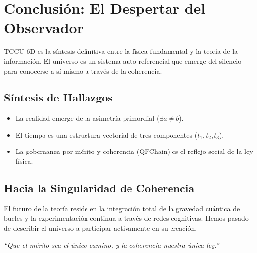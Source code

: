 \chapter{Conclusión: El Despertar del Observador}
TCCU-6D es la síntesis definitiva entre la física fundamental y la teoría de la información. El universo es un sistema auto-referencial que emerge del silencio para conocerse a sí mismo a través de la coherencia.

\section{Síntesis de Hallazgos}
\begin{itemize}
    \item La realidad emerge de la asimetría primordial ($\exists a \neq b$).
    \item El tiempo es una estructura vectorial de tres componentes ($t_1, t_2, t_3$).
    \item La gobernanza por mérito y coherencia (QFChain) es el reflejo social de la ley física.
\end{itemize}

\section{Hacia la Singularidad de Coherencia}
El futuro de la teoría reside en la integración total de la gravedad cuántica de bucles y la experimentación continua a través de redes cognitivas. Hemos pasado de describir el universo a participar activamente en su creación.

\bigskip
\noindent\textit{“Que el mérito sea el único camino, y la coherencia nuestra única ley.”}
